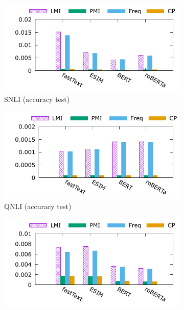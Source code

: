 \begin{figure}[th]
\centering
\begin{subfigure}[b]{0.24\textwidth}
\centering
\includegraphics[width=\columnwidth]{data/acc_snli.pdf}
\caption{SNLI (accuracy test)}
\label{fig:cue_snli}
\end{subfigure}
\hfill
\begin{subfigure}[b]{0.24\textwidth}
\centering
\includegraphics[width=\columnwidth]{data/acc_qnli.pdf}
\caption{QNLI (accuracy test)}
\label{fig:cue_qnli}
\end{subfigure}
\hfill
\begin{subfigure}[b]{0.24\textwidth}
\centering
\includegraphics[width=\columnwidth]{data/acc_mnli.pdf}

\end{subfigure}
\end{figure}
